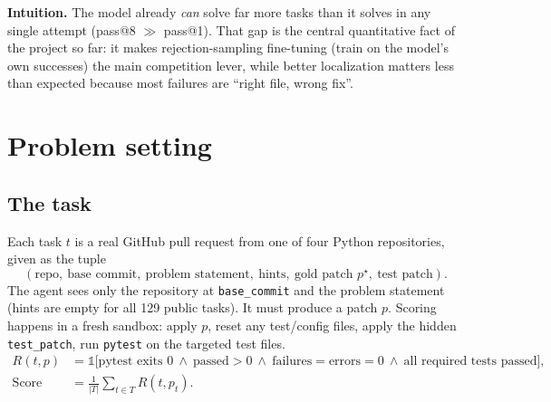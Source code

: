 \documentclass[10pt,a4paper]{article}
\newcommand{\code}[1]{\texttt{#1}}
\newcommand{\1}{\mathbb{1}}
\newcommand{\insight}[1]{\par\smallskip\noindent\colorbox{NavyBlue!7}{\parbox{\dimexpr\linewidth-2\fboxsep}{\small\textbf{Intuition.} #1}}\par\smallskip}
\begin{document}
\insight{The model already \emph{can} solve far more tasks than it solves in any single attempt
(pass@8 $\gg$ pass@1). That gap is the central quantitative fact of the project so far: it makes
rejection-sampling fine-tuning (train on the model's own successes) the main competition lever, while
better localization matters less than expected because most failures are ``right file, wrong fix''.}

\section{Problem setting}
\subsection{The task}
Each task $t$ is a real GitHub pull request from one of four Python repositories, given as the tuple
\[(\text{repo},\ \text{base commit},\ \text{problem statement},\ \text{hints},\ \text{gold patch } p^\star,\ \text{test patch}).\]
The agent sees only the repository at \code{base\_commit} and the problem statement (hints are empty for
all 129 public tasks). It must produce a patch $p$. Scoring happens in a fresh sandbox: apply $p$, reset
any test/config files, apply the hidden \code{test\_patch}, run \code{pytest} on the targeted test files.
\begin{align*}
R(t,p)&=\1\big[\text{pytest exits }0\ \wedge\ \text{passed}>0\ \wedge\ \text{failures}=\text{errors}=0\ \wedge\ \text{all required tests passed}\big],\\
\text{Score}&=\frac{1}{|T|}\sum_{t\in T}R(t,p_t).
\end{align*}
\end{document}
